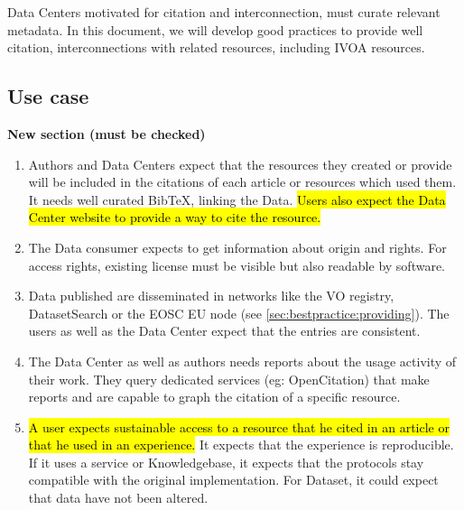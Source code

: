 \documentclass[11pt,a4paper]{ivoa}
\begin{document}

Data Centers motivated for citation and interconnection, must curate relevant metadata. 
In this document, we will develop good practices to provide well citation, interconnections with related resources, including IVOA resources.


\subsection{Use case}
\textbf{\color{red}New section (must be checked)}

\begin{enumerate}
	\item Authors and Data Centers expect that the resources they created or provide will be included in the citations of each article or resources which used them. It needs well curated BibTeX, linking the Data. 
	\hl{Users also expect the Data Center website to provide a way to cite the resource.}
	
	\item The Data consumer expects to get information about origin and rights. For access rights, existing license must be visible but also readable by software.
	
	\item Data published are disseminated in networks like the VO registry, DatasetSearch or the EOSC EU node (see \ref{sec:bestpractice:providing}). The users as well as the Data Center expect that the entries are consistent.
	
	\item The Data Center as well as authors needs reports about the usage activity of their work. They query dedicated services (eg: OpenCitation) that make reports and are capable to graph the citation of a specific resource.
	
	\item 
	\hl{A user expects sustainable access to a resource that he cited in an article or that he used in an experience.}
	It expects that the experience is reproducible. If it uses a service or Knowledgebase, it expects that the protocols stay compatible with the original implementation. For Dataset, it could expect that data have not been altered. 
	
	
\end{enumerate}
\end{document}
